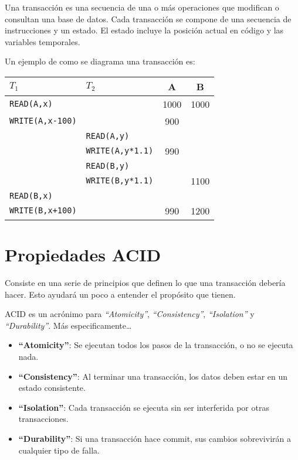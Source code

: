 Una transacción es una secuencia de una o más operaciones que modifican o consultan una base de datos. Cada transacción se compone de una secuencia de instrucciones y un estado. El estado incluye la posición actual en código y las variables temporales.

Un ejemplo de como se diagrama una transacción es:
\begin{center}
  \begin{tabular}{ll|cc}
    \textbf{$T_1$}          & \textbf{$T_2$}          & A    & B       \\\hline
    \texttt{READ(A,x)}      &                         & 1000 & 1000    \\
    \texttt{WRITE(A,x-100)} &                         & 900  &         \\
                            & \texttt{READ(A,y)}      &      &         \\
                            & \texttt{WRITE(A,y*1.1)} & 990  &         \\
                            & \texttt{READ(B,y)}      &      &         \\
                            & \texttt{WRITE(B,y*1.1)} &      & 1100    \\
    \texttt{READ(B,x)}      &                         &      &         \\
    \texttt{WRITE(B,x+100)} &                         & 990  & 1200    \\
  \end{tabular}
\end{center}

\section{Propiedades ACID}
Consiste en una serie de principios que definen lo que una transacción debería hacer. Esto ayudará un poco a entender el propósito que tienen.

ACID es un acrónimo para \textit{``Atomicity''}, \textit{``Consistency''}, \textit{``Isolation''} y \textit{``Durability''}. Más especificamente\dots

\begin{itemize}
  \item \textbf{``Atomicity''}: Se ejecutan todos los pasos de la transacción, o no se ejecuta nada.
  \item \textbf{``Consistency''}: Al terminar una transacción, los datos deben estar en un estado consistente.
  \item \textbf{``Isolation''}: Cada transacción se ejecuta sin ser interferida por otras transacciones.
  \item \textbf{``Durability''}: Si una transacción hace commit, sus cambios sobrevivirán a cualquier tipo de falla.
\end{itemize}
\pagebreak

